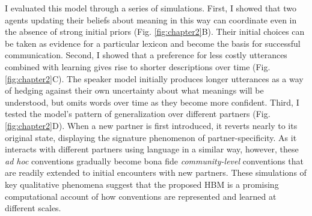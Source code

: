 \documentclass[11pt]{article}
\begin{document}

I evaluated this model through a series of simulations.
First, I showed that two agents updating their beliefs about meaning in this way can coordinate even in the absence of strong initial priors (Fig. \ref{fig:chapter2}B).
Their initial choices can be taken as evidence for a particular lexicon and become the basis for successful communication.
Second, I showed that a preference for less costly utterances combined with learning gives rise to shorter descriptions over time (Fig. \ref{fig:chapter2}C).
The speaker model initially produces longer utterances as a way of hedging against their own uncertainty about what meanings will be understood, but omits words over time as they become more confident. 
Third, I tested the model's pattern of generalization over different partners (Fig. \ref{fig:chapter2}D).
When a new partner is first introduced, it reverts nearly to its original state, displaying the signature phenomenon of partner-specificity. 
As it interacts with different partners using language in a similar way, however, these \emph{ad hoc} conventions gradually become bona fide \emph{community-level} conventions that are readily extended to initial encounters with new partners. 
These simulations of key qualitative phenomena suggest that the proposed HBM is a promising computational account of how conventions are represented and learned at different scales.

\end{document}

